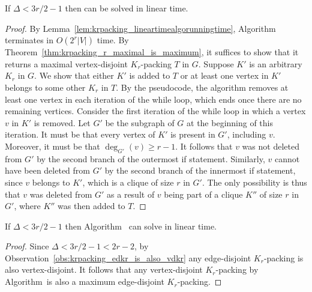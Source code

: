 \begin{thm}
\label{thm:krpacking_vdkr_3r2minus1}
If $\Delta < 3r/2 - 1$ then \vdkr can be solved in linear time.
\end{thm}
\begin{proof}
By Lemma~\ref{lem:krpacking_lineartimealgorunningtime}, Algorithm~ terminates in $O(2^r |V|)$ time. By Theorem~\ref{thm:krpacking_r_maximal_is_maximum}, it suffices to show that it returns a maximal vertex-disjoint $K_r$-packing $T$ in $G$. Suppose $K'$ is an arbitrary $K_r$ in $G$. We show that either $K'$ is added to $T$ or at least one vertex in $K'$ belongs to some other $K_r$ in $T$. By the pseudocode, the algorithm removes at least one vertex in each iteration of the while loop, which ends once there are no remaining vertices. Consider the first iteration of the while loop in which a vertex $v$ in $K'$ is removed. Let $G'$ be the subgraph of $G$ at the beginning of this iteration. It must be that every vertex of $K'$ is present in $G'$, including $v$. Moreover, it must be that $\deg_{G'}(v) \geq r - 1$. It follows that $v$ was not deleted from $G'$ by the second branch of the outermost if statement. Similarly, $v$ cannot have been deleted from $G'$ by the second branch of the innermost if statement, since $v$ belongs to $K'$, which is a clique of size $r$ in $G'$. The only possibility is thus that $v$ was deleted from $G'$ as a result of $v$ being part of a clique $K''$ of size $r$ in $G'$, where $K''$ was then added to $T$.
\end{proof}

\begin{cor}
\label{cor:krpacking_edkr_3r2minus2}
If $\Delta < 3r/2 - 1$ then Algorithm~ can solve \edkr in linear time.
\end{cor}
\begin{proof}
Since $\Delta < 3r/2 - 1 < 2r - 2$, by Observation~\ref{obs:krpacking_edkr_is_also_vdkr} any edge-disjoint $K_r$-packing is also vertex-disjoint. It follows that any vertex-disjoint $K_r$-packing by Algorithm~is also a maximum edge-disjoint $K_r$-packing.
\end{proof}
